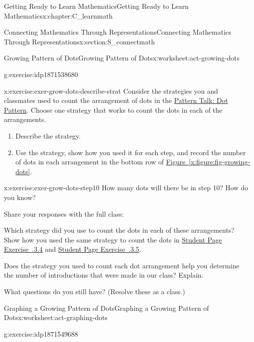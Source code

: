 \documentclass[oneside,10pt,]{book}
\newcommand{\xreffont}{\relax}
\numberwithin{equation}{chapter}
\begin{document}
\begin{chapterptx}{Getting Ready to Learn Mathematics}{}{Getting Ready to Learn Mathematics}{}{}{x:chapter:C_learnmath}
\begin{sectionptx}{Connecting Mathematics Through Representations}{}{Connecting Mathematics Through Representations}{}{}{x:section:S_connectmath}
\begin{worksheet-subsection}{Growing Pattern of Dots}{}{Growing Pattern of Dots}{}{}{x:worksheet:act-growing-dots}
\begin{divisionexercise}{3}{}{}{g:exercise:idp1871538680}
\begin{enumerate}[font=\bfseries,label=(\alph*),ref=\alph*]
\end{enumerate}
\end{divisionexercise}%
\begin{divisionexercise}{4}{}{}{x:exercise:exer-grow-dots-describe-strat}%
Consider the strategies you and classmates used to count the arrangement of dots in the \hyperref[x:subsection:SS_dot_pattern]{Pattern Talk: Dot Pattern}. Choose one strategy that works to count the dots in each of the arrangements.%
\begin{enumerate}[font=\bfseries,label=(\alph*),ref=\alph*]
\item{}Describe the strategy.%
\item{}Use the strategy, show how you used it for each step, and record the number of dots in each arrangement in the bottom row of \hyperref[x:figure:fig-growing-dots]{Figure~{\xreffont\ref{x:figure:fig-growing-dots}}}.%
\end{enumerate}
\end{divisionexercise}%
\begin{divisionexercise}{5}{}{}{x:exercise:exer-grow-dots-step10}%
How many dots will there be in step 10? How do you know?%
\end{divisionexercise}%
\begin{conclusion}{}%
Share your responses with the full class:%
\par
Which strategy did you use to count the dots in each of these arrangements? Show how you used the same strategy to count the dots in \hyperlink{x:exercise:exer-grow-dots-describe-strat}{Student Page Exercise~{\xreffont 1.3.3.4}} and \hyperlink{x:exercise:exer-grow-dots-step10}{Student Page Exercise~{\xreffont 1.3.3.5}}.%
\par
Does the strategy you used to count each dot arrangement help you determine the number of introductions that were made in our class? Explain.%
\par
What questions do you still have? (Resolve these as a class.)%
\end{conclusion}%
\end{worksheet-subsection}
\restoregeometry
%
%
\typeout{************************************************}
\typeout{************************************************}
%
\begin{worksheet-subsection}{Graphing a Growing Pattern of Dots}{}{Graphing a Growing Pattern of Dots}{}{}{x:worksheet:act-graphing-dots}
\begin{divisionexercise}{1}{}{}{g:exercise:idp1871549688}%

\end{divisionexercise}
\end{worksheet-subsection}
\end{sectionptx}
\end{chapterptx}
\end{document}
